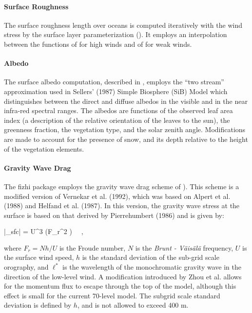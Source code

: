 \paragraph{Surface Roughness}
The surface roughness length over oceans is computed iteratively with the wind
stress by the surface layer parameterization (\cite{helfschu:95}).
It employs an interpolation between the functions of \cite{larpond:81}
for high winds and of \cite{kondo:75} for weak winds.


\paragraph{Albedo}
The surface albedo computation, described in \cite{ks:91},
employs the ``two stream'' approximation used in Sellers' (1987) Simple Biosphere (SiB)
Model which distinguishes between the direct and diffuse albedos in the visible
and in the near infra-red spectral ranges. The albedos are functions of the observed
leaf area index (a description of the relative orientation of the leaves to the
sun), the greenness fraction, the vegetation type, and the solar zenith angle.
Modifications are made to account for the presence of snow, and its depth relative
to the height of the vegetation elements.

\paragraph{Gravity Wave Drag}

The fizhi package employs the gravity wave drag scheme of \cite{zhouetal:95}).
This scheme is a modified version of Vernekar et al. (1992),
which was based on Alpert et al. (1988) and Helfand et al. (1987).  
In this version, the gravity wave stress at the surface is
based on that derived by Pierrehumbert (1986) and is given by:

\bq
|\vec{\tau}_{sfc}| = {\rho U^3} \left(F_r^2 \right) \, \, ,
\eq

where $F_r = N h /U$ is the Froude number, $N$ is the {\em Brunt - V\"{a}is\"{a}l\"{a}} frequency, $U$ is the 
surface wind speed, $h$ is the standard deviation of the sub-grid scale orography,
and $\ell^*$ is the wavelength of the monochromatic gravity wave in the direction of the low-level wind.
A modification introduced by Zhou et al. allows for the momentum flux to
escape through the top of the model, although this effect is small for the current 70-level model.  
The subgrid scale standard deviation is defined by $h$, and is not allowed to exceed 400 m. 

